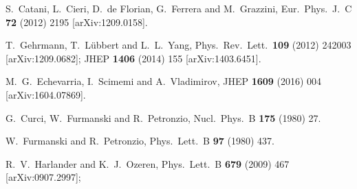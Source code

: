 \documentclass[12pt]{article}
\begin{document}
\begin{thebibliography}{99}
  S.~Catani, L.~Cieri, D.~de Florian, G.~Ferrera and M.~Grazzini,
  Eur.\ Phys.\ J.\ C {\bf 72} (2012) 2195
  [arXiv:1209.0158].

   T.~Gehrmann, T.~L\"ubbert and L.~L.~Yang,
   Phys.\ Rev.\ Lett.\  {\bf 109} (2012) 242003
   [arXiv:1209.0682];
   JHEP {\bf 1406} (2014) 155
   [arXiv:1403.6451].

  M.~G.~Echevarria, I.~Scimemi and A.~Vladimirov,
  JHEP {\bf 1609} (2016) 004
  [arXiv:1604.07869].

  

  G.~Curci, W.~Furmanski and R.~Petronzio,
  Nucl.\ Phys.\ B {\bf 175} (1980) 27.

  W.~Furmanski and R.~Petronzio,
  Phys.\ Lett.\ B {\bf 97} (1980) 437.


  R.~V.~Harlander and K.~J.~Ozeren,
  Phys.\ Lett.\ B {\bf 679} (2009) 467
  [arXiv:0907.2997];




\end{thebibliography}
\end{document}
